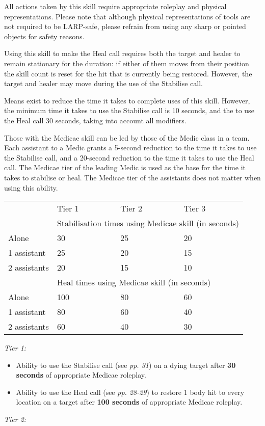 All actions taken by this skill require appropriate roleplay and physical representations. Please note that although physical representations of tools are not required to be LARP-safe, please refrain from using any sharp or pointed objects for safety reasons.

Using this skill to make the Heal call requires both the target and healer to remain stationary for the duration: if either of them moves from their position the skill count is reset for the hit that is currently being restored. However, the target and healer may move during the use of the Stabilise call.

Means exist to reduce the time it takes to complete uses of this skill. However, the minimum time it takes to use the Stabilise call is 10 seconds, and the to use the Heal call 30 seconds, taking into account all modifiers.

Those with the Medicae skill can be led by those of the Medic class in a team. Each assistant to a Medic grants a 5-second reduction to the time it takes to use the Stabilise call, and a 20-second reduction to the time it takes to use the Heal call. The Medicae tier of the leading Medic is used as the base for the time it takes to stabilise or heal. The Medicae tier of the assistants does not matter when using this ability.

\begin{table}[H]
\begin{tabular}{|l|l|l|l|} \hline 
\multirow{1}{*}{}& Tier 1 & Tier 2 & Tier 3 \\
\cline{2-2}\cline{3-3}\cline{4-4} & \multicolumn{3}{|l|}{Stabilisation times using Medicae skill (in seconds)} \\
 \hline Alone & 30 & 25 & 20 \\
 \hline 1 assistant & 25 & 20 & 15 \\
 \hline 2 assistants & 20 & 15 & 10 \\
 \hline  & \multicolumn{3}{|l|}{Heal times using Medicae skill (in seconds)} \\
 \hline Alone & 100 & 80 & 60 \\
 \hline 1 assistant & 80 & 60 & 40 \\
 \hline 2 assistants & 60 & 40 & 30 \\
 \hline \end{tabular}

\end{table}

\textit{Tier 1:}

\begin{itemize}
\item Ability to use the Stabilise call (see \textit{pp. 31}) on a dying target after \textbf{30 seconds} of appropriate Medicae roleplay.

\item Ability to use the Heal call (see \textit{pp. 28-29}) to restore 1 body hit to every location on a target after \textbf{100 seconds} of appropriate Medicae roleplay.

\end{itemize}
\textit{Tier 2:}

